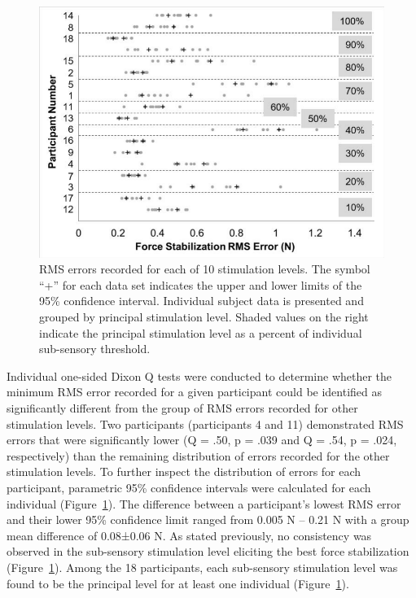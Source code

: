 \documentclass[]{cik}%
\begin{document}
\begin{figure}

{\centering \includegraphics[width=1\textwidth,height=\textheight]{./figures/fig6.pdf}

}

\caption{\label{fig-6}RMS errors recorded for each of 10 stimulation
levels. The symbol ``+'' for each data set indicates the upper and lower
limits of the 95\% confidence interval. Individual subject data is
presented and grouped by principal stimulation level. Shaded values on
the right indicate the principal stimulation level as a percent of
individual sub-sensory threshold.}

\end{figure}

Individual one-sided Dixon Q tests were conducted to determine whether
the minimum RMS error recorded for a given participant could be
identified as significantly different from the group of RMS errors
recorded for other stimulation levels. Two participants (participants 4
and 11) demonstrated RMS errors that were significantly lower (Q = .50,
p = .039 and Q = .54, p = .024, respectively) than the remaining
distribution of errors recorded for the other stimulation levels. To
further inspect the distribution of errors for each participant,
parametric 95\% confidence intervals were calculated for each individual
(Figure~\ref{fig-6}). The difference between a participant's lowest RMS
error and their lower 95\% confidence limit ranged from 0.005 N -- 0.21
N with a group mean difference of 0.08±0.06 N. As stated previously, no
consistency was observed in the sub-sensory stimulation level eliciting
the best force stabilization (Figure~\ref{fig-6}). Among the 18
participants, each sub-sensory stimulation level was found to be the
principal level for at least one individual (Figure~\ref{fig-6}).
\end{document}

